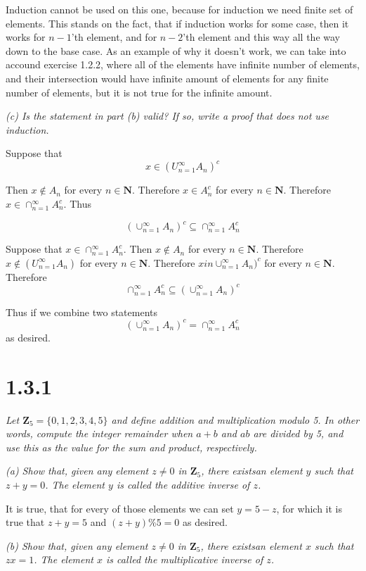\documentclass[11pt,oneside,titlepage]{article}
\begin{document}
Induction cannot be used on this one, because for induction we need finite
set of elements. This stands on the fact, that if induction works for
some case, then it works for $n - 1$'th element, and for $n - 2$'th element
and this way all the way down to the base case. As an example of why it doesn't
work, we can take into accound exercise 1.2.2, where all of the elements have
infinite number of elements, and their intersection would have infinite amount
of elements  for any finite number of elements, but it is not true for the
infinite amount.

\textit{(c) Is the statement in part (b) valid? If so, write a proof that does
  not use induction.}

Suppose that
$$x \in (U^{\infty}_{n = 1}A_n)^c$$

Then $x \notin A_n$ for every $n \in \textbf{N}$. Therefore $x \in A^c_n$ for every $n \in \textbf{N}$. Therefore $x \in \cap^{\infty}_{n = 1}A^c_n$. Thus

$$(\cup^{\infty}_{n = 1}A_n)^c \subseteq \cap^{\infty}_{n = 1}A^c_n$$

Suppose that $x \in \cap^{\infty}_{n = 1}A^c_n$. Then $x \notin A_n$ for every $n \in \textbf{N}$. Therefore $x \notin (U^{\infty}_{n = 1}A_n)$ for every $n \in \textbf{N}$. Therefore $x in \cup^{\infty}_{n = 1}A_n)^c$ for every $n \in \textbf{N}$. Therefore
$$ \cap^{\infty}_{n = 1}A^c_n \subseteq  (\cup^{\infty}_{n = 1}A_n)^c$$

Thus if we combine two statements
$$(\cup^{\infty}_{n = 1}A_n)^c = \cap^{\infty}_{n = 1}A^c_n$$
as desired.

\section*{1.3.1}
\textit{Let $\textbf{Z}_5 = \{0, 1, 2, 3, 4, 5\}$ and define addition and
  multiplication modulo 5. In other words, compute the integer remainder when
  $a + b$ and $ab$ are divided by 5, and use this as the value for the sum and
  product, respectively.}

\textit{(a) Show that, given any element $z \neq 0$ in $\textbf{Z}_5$, there
  existsan element $y$ such that $z + y = 0$. The element $y$ is called the
  additive inverse of $z$.}

It is true, that for every of those elements we can set $y = 5 - z$, for which
it is true that $z + y = 5$ and $(z + y)\%5 = 0$ as desired.

\textit{(b) Show that, given any element $z \neq 0$ in $\textbf{Z}_5$, there
  existsan element $x$ such that $zx = 1$. The element $x$ is called the
  multiplicative inverse of $z$.}
\end{document}

